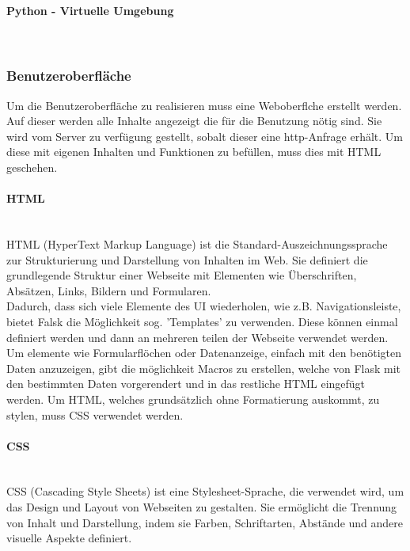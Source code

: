 \paragraph{Python - Virtuelle Umgebung}\mbox{}\\


\subsubsection{Benutzeroberfläche}

Um die Benutzeroberfläche zu realisieren muss eine Weboberflche erstellt werden. Auf dieser werden alle Inhalte angezeigt die für die Benutzung nötig sind. Sie wird vom Server zu verfügung gestellt, sobalt dieser eine http-Anfrage erhält. Um diese mit eigenen Inhalten und Funktionen zu befüllen, muss dies mit HTML geschehen.

\paragraph{HTML}\mbox{}\\
HTML (HyperText Markup Language) ist die Standard-Auszeichnungssprache zur Strukturierung und Darstellung von Inhalten im Web. Sie definiert die grundlegende Struktur einer Webseite mit Elementen wie Überschriften, Absätzen, Links, Bildern und Formularen. \cite{chatgpt}\\

Dadurch, dass sich viele Elemente des UI wiederholen, wie z.B. Navigationsleiste, bietet Falsk die Möglichkeit sog. 'Templates' zu verwenden. Diese können einmal definiert werden und dann an mehreren teilen der Webseite verwendet werden.
Um elemente wie Formularflöchen oder Datenanzeige, einfach mit den benötigten Daten anzuzeigen, gibt die möglichkeit Macros zu erstellen, welche von Flask mit den bestimmten Daten vorgerendert und in das restliche HTML eingefügt werden.
Um HTML, welches grundsätzlich ohne Formatierung auskommt, zu stylen, muss CSS verwendet werden. 

\paragraph{CSS}\mbox{}\\
CSS (Cascading Style Sheets) ist eine Stylesheet-Sprache, die verwendet wird, um das Design und Layout von Webseiten zu gestalten. Sie ermöglicht die Trennung von Inhalt und Darstellung, indem sie Farben, Schriftarten, Abstände und andere visuelle Aspekte definiert.\cite{chatgpt}\\

